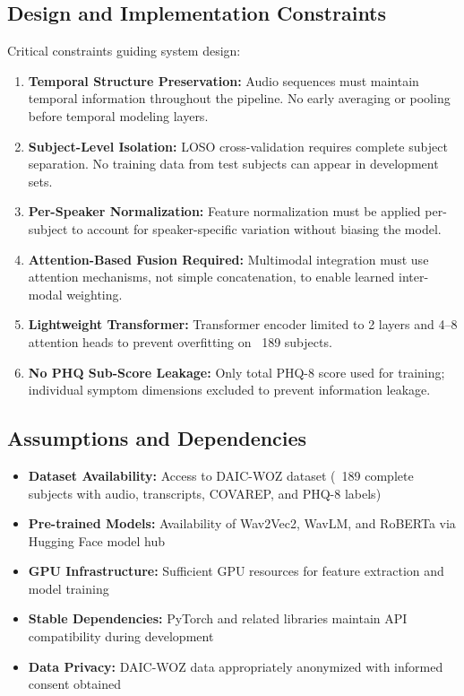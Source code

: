 \documentclass[12pt]{article}
\begin{document}
	\subsection{Design and Implementation Constraints}

	Critical constraints guiding system design:

	\begin{enumerate}
		\item \textbf{Temporal Structure Preservation:} Audio sequences must maintain temporal information throughout the pipeline. No early averaging or pooling before temporal modeling layers.

		\item \textbf{Subject-Level Isolation:} LOSO cross-validation requires complete subject separation. No training data from test subjects can appear in development sets.

		\item \textbf{Per-Speaker Normalization:} Feature normalization must be applied per-subject to account for speaker-specific variation without biasing the model.

		\item \textbf{Attention-Based Fusion Required:} Multimodal integration must use attention mechanisms, not simple concatenation, to enable learned inter-modal weighting.

		\item \textbf{Lightweight Transformer:} Transformer encoder limited to 2 layers and 4--8 attention heads to prevent overfitting on ~189 subjects.

		\item \textbf{No PHQ Sub-Score Leakage:} Only total PHQ-8 score used for training; individual symptom dimensions excluded to prevent information leakage.
	\end{enumerate}

	\subsection{Assumptions and Dependencies}

	\begin{itemize}
		\item \textbf{Dataset Availability:} Access to DAIC-WOZ dataset (~189 complete subjects with audio, transcripts, COVAREP, and PHQ-8 labels)
		\item \textbf{Pre-trained Models:} Availability of Wav2Vec2, WavLM, and RoBERTa via Hugging Face model hub
		\item \textbf{GPU Infrastructure:} Sufficient GPU resources for feature extraction and model training
		\item \textbf{Stable Dependencies:} PyTorch and related libraries maintain API compatibility during development
		\item \textbf{Data Privacy:} DAIC-WOZ data appropriately anonymized with informed consent obtained
	\end{itemize}
\end{document}
